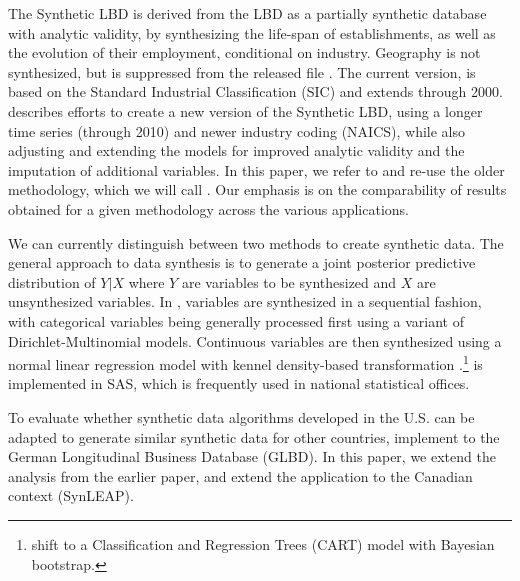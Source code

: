 

The Synthetic LBD is derived from the LBD as a partially synthetic database with analytic validity, by synthesizing the life-span of establishments, as well as the evolution of their employment, conditional on industry. Geography is not synthesized, but is suppressed from the released file \citep{RePEc:cen:tnotes:11-01}. The current version, is based on the Standard Industrial Classification (SIC) and extends through 2000. \citet{RePEc:cen:wpaper:14-12} describes efforts to create a new version of the Synthetic LBD, using a longer time  series (through 2010) and newer industry coding (NAICS), while also adjusting and extending the models for  improved  analytic validity and  the imputation of additional variables. In this paper, we refer to and re-use the older methodology, which we will call \SynLBD. Our emphasis is on the comparability of results obtained for a given methodology across the various applications.
  

We can currently distinguish between two methods to create synthetic data. The general approach to data synthesis is to generate a joint posterior predictive distribution of $Y|X$ where $Y$ are variables to be synthesized and $X$ are unsynthesized variables. In \SynLBD, variables are synthesized in a sequential fashion, with categorical variables being generally processed first using a variant of Dirichlet-Multinomial models. Continuous variables are then synthesized using a normal linear regression model with kennel density-based transformation \citep{WOODCOCK20094228}.\footnote{\textcite{RePEc:cen:wpaper:14-12} shift  to a Classification and Regression Trees (CART) model with Bayesian bootstrap. } \SynLBD{} is implemented in SAS\texttrademark, which is frequently used in national statistical offices.

To evaluate whether synthetic data algorithms developed in the U.S. can be adapted to generate similar synthetic data for other countries, \textcite{RePEc:cen:wpaper:14-13} implement \SynLBD{} to the German Longitudinal Business Database (GLBD). In this paper, we extend the analysis from the earlier paper, and extend the application to the Canadian context (SynLEAP). 

